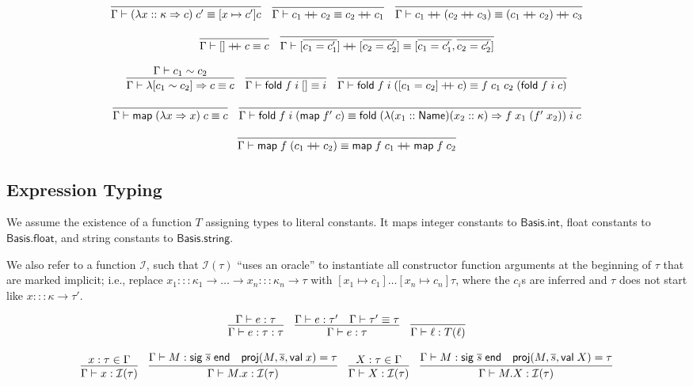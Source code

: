 \documentclass{article}
\newcommand{\mt}[1]{\mathsf{#1}}
\newcommand{\rc}{+ \hspace{-.075in} + \;}
\begin{document}
$$\infer{\Gamma \vdash (\lambda x :: \kappa \Rightarrow c) \; c' \equiv [x \mapsto c'] c}{}
\quad \infer{\Gamma \vdash c_1 \rc c_2 \equiv c_2 \rc c_1}{}
\quad \infer{\Gamma \vdash c_1 \rc (c_2 \rc c_3) \equiv (c_1 \rc c_2) \rc c_3}{}$$

$$\infer{\Gamma \vdash [] \rc c \equiv c}{}
\quad \infer{\Gamma \vdash [\overline{c_1 = c'_1}] \rc [\overline{c_2 = c'_2}] \equiv [\overline{c_1 = c'_1}, \overline{c_2 = c'_2}]}{}$$

$$\infer{\Gamma \vdash \lambda [c_1 \sim c_2] \Rightarrow c \equiv c}{
  \Gamma \vdash c_1 \sim c_2
}
\quad \infer{\Gamma \vdash \mt{fold} \; f \; i \; [] \equiv i}{}
\quad \infer{\Gamma \vdash \mt{fold} \; f \; i \; ([c_1 = c_2] \rc c) \equiv f \; c_1 \; c_2 \; (\mt{fold} \; f \; i \; c)}{}$$

$$\infer{\Gamma \vdash \mt{map} \; (\lambda x \Rightarrow x) \; c \equiv c}{}
\quad \infer{\Gamma \vdash \mt{fold} \; f \; i \; (\mt{map} \; f' \; c)
  \equiv \mt{fold} \; (\lambda (x_1 :: \mt{Name}) (x_2 :: \kappa) \Rightarrow f \; x_1 \; (f' \; x_2)) \; i \; c}{}$$

$$\infer{\Gamma \vdash \mt{map} \; f \; (c_1 \rc c_2) \equiv \mt{map} \; f \; c_1 \rc \mt{map} \; f \; c_2}{}$$

\subsection{Expression Typing}

We assume the existence of a function $T$ assigning types to literal constants.  It maps integer constants to $\mt{Basis}.\mt{int}$, float constants to $\mt{Basis}.\mt{float}$, and string constants to $\mt{Basis}.\mt{string}$.

We also refer to a function $\mathcal I$, such that $\mathcal I(\tau)$ ``uses an oracle'' to instantiate all constructor function arguments at the beginning of $\tau$ that are marked implicit; i.e., replace $x_1 ::: \kappa_1 \to \ldots \to x_n ::: \kappa_n \to \tau$ with $[x_1 \mapsto c_1]\ldots[x_n \mapsto c_n]\tau$, where the $c_i$s are inferred and $\tau$ does not start like $x ::: \kappa \to \tau'$.

$$\infer{\Gamma \vdash e : \tau : \tau}{
  \Gamma \vdash e : \tau
}
\quad \infer{\Gamma \vdash e : \tau}{
  \Gamma \vdash e : \tau'
  & \Gamma \vdash \tau' \equiv \tau
}
\quad \infer{\Gamma \vdash \ell : T(\ell)}{}$$

$$\infer{\Gamma \vdash x : \mathcal I(\tau)}{
  x : \tau \in \Gamma
}
\quad \infer{\Gamma \vdash M.x : \mathcal I(\tau)}{
  \Gamma \vdash M : \mt{sig} \; \overline{s} \; \mt{end}
  & \mt{proj}(M, \overline{s}, \mt{val} \; x) = \tau
}
\quad \infer{\Gamma \vdash X : \mathcal I(\tau)}{
  X : \tau \in \Gamma
}
\quad \infer{\Gamma \vdash M.X : \mathcal I(\tau)}{
  \Gamma \vdash M : \mt{sig} \; \overline{s} \; \mt{end}
  & \mt{proj}(M, \overline{s}, \mt{val} \; X) = \tau
}$$
\end{document}
